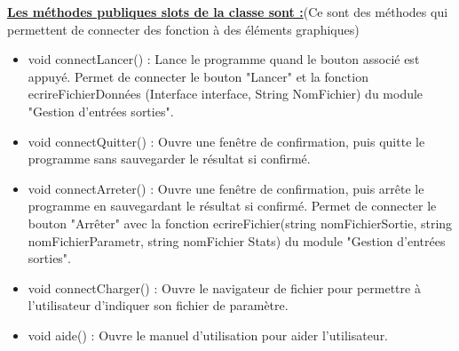 \documentclass[a4paper,11pt]{article}
\begin{document}
			\underline{\bf Les méthodes publiques slots de la classe sont :}(Ce sont des méthodes qui permettent de connecter des fonction à des éléments graphiques)\\

			\begin{itemize}
				\item void connectLancer() : Lance le programme quand le bouton associé est appuyé. Permet de connecter le bouton "Lancer" et la fonction ecrireFichierDonnées (Interface interface, String NomFichier) du module "Gestion d'entrées sorties".\vspace{0.2cm}
				\item void connectQuitter() : Ouvre une fenêtre de confirmation, puis quitte le programme sans sauvegarder le résultat si confirmé.\vspace{0.2cm}
				\item void connectArreter() : Ouvre une fenêtre de confirmation, puis arrête le programme en sauvegardant le résultat si confirmé. Permet de connecter le bouton "Arrêter" avec la fonction ecrireFichier(string nomFichierSortie, string nomFichierParametr, string nomFichier Stats) du module "Gestion d'entrées sorties".\vspace{0.2cm} 
				\item void connectCharger() : Ouvre le navigateur de fichier pour permettre à l’utilisateur d’indiquer son fichier de paramètre.\vspace{0.2cm}
				\item void aide() : Ouvre le manuel d’utilisation pour aider l’utilisateur.\\
			\end{itemize}
			
\end{document}
